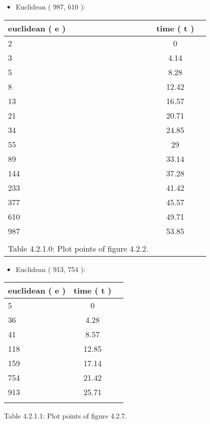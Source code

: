 \documentclass[10pt,a4paper]{article}
\begin{document}
\begin{multicols}{2}
\begin{center}
\begin{itemize}
\item Euclidean ( 987, 610 ):
\end{itemize}  \hfill \break
\begin{tabular}[.5cm]{l c c }
\toprule
euclidean ( e ) & time ( t )  \\
\midrule
2 & 0 \\
\cmidrule{1-2}
3 & 4.14 \\
\cmidrule{1-2}
5 & 8.28 \\
\cmidrule{1-2}
8 & 12.42 \\
\cmidrule{1-2}
13 & 16.57 \\
\cmidrule{1-2}
21 & 20.71 \\
\cmidrule{1-2}
34 & 24.85 \\
\cmidrule{1-2}
55 & 29 \\
\cmidrule{1-2}
89 & 33.14 \\
\cmidrule{1-2}
144 & 37.28 \\
\cmidrule{1-2}
233 & 41.42 \\
\cmidrule{1-2}
377 & 45.57 \\
\cmidrule{1-2}
610 & 49.71\\
\cmidrule{1-2}
987 & 53.85 \\
\bottomrule
& \\
Table 4.2.1.0: Plot points of figure 4.2.2.
\end{tabular}
\end{center}

\begin{center}
\begin{itemize}
\item Euclidean ( 913, 754 ):
\end{itemize} \hfill \break
\begin{tabular}[.5cm]{l c c }
\toprule
euclidean ( e ) & time ( t )  \\
\midrule
5 & 0 \\
\cmidrule{1-2}
36 & 4.28 \\
\cmidrule{1-2}
41 & 8.57 \\
\cmidrule{1-2}
118 & 12.85 \\
\cmidrule{1-2}
159 & 17.14 \\
\cmidrule{1-2}
754 & 21.42 \\
\cmidrule{1-2}
913 & 25.71 \\
\bottomrule
\linebreak
\end{tabular}
\centering \linebreak \linebreak Table 4.2.1.1: Plot points of figure 4.2.7.
\end{center}
\end{multicols} 
\end{document}
